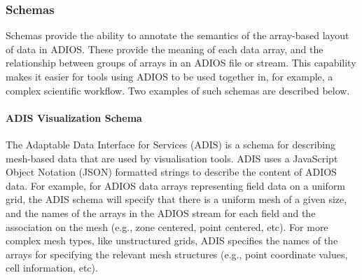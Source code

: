 \documentclass[x11names,table,xcdraw,graybox]{svmult}
\begin{document}
\subsubsection{Schemas}
Schemas provide the ability to annotate the semantics of the array-based layout of data in ADIOS.
These provide the meaning of each data array, and the relationship between groups of arrays in an ADIOS file or stream.
This capability makes it easier for tools using ADIOS to be used together in, for example, a complex scientific workflow.
Two examples of such schemas are described below.

\paragraph{\textbf{ADIS Visualization Schema}}


The Adaptable Data Interface for Services (ADIS) is a schema for describing mesh-based data that are used by visualisation tools. ADIS uses a JavaScript Object Notation (JSON) formatted strings to describe the content of ADIOS data. For example, for ADIOS data arrays representing field data on a uniform grid, the ADIS schema will specify that there is a uniform mesh of a given size, and the names of the arrays in the ADIOS stream for each field and the association on the mesh (e.g., zone centered, point centered, etc).
For more complex mesh types, like unstructured grids, ADIS specifies the names of the arrays for specifying the relevant mesh structures (e.g., point  coordinate values, cell information, etc).
\end{document}
